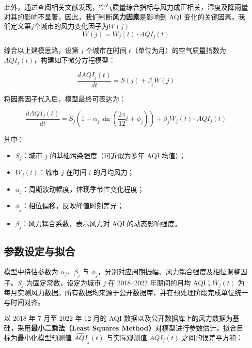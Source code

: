 \documentclass[a4paper,12pt]{article}
\begin{document}
	
	此外，通过查阅相关文献\cite{ref3}发现，空气质量综合指标与风力成正相关，湿度及降雨量对其的影响不显著。因此，我们判断\textbf{风力因素}是影响到 AQI 变化的关键因素。我们定义第$j$个城市的风力变化因子为$W(j)$
	\begin{equation}
		W(j) =  W_j(t) \cdot AQI_j(t)
		\label{eq:wj}
	\end{equation}
	
	综合以上建模思路，设第 $j$ 个城市在时间 $t$（单位为月）的空气质量指数为 $AQI_j(t)$，构建如下微分方程模型：
	
	\begin{equation}
		\frac{dAQI_j(t)}{dt} = S(j) + \beta_j W(j)
		\label{eq:sum}
	\end{equation}
	
	将因素因子代入后，模型最终可表达为：
	
	\begin{equation}
		\frac{dAQI_j(t)}{dt} = S_j \left(1 + \alpha_j \sin\left(\frac{2\pi}{12}t + \phi_j \right) \right) + \beta_j W_j(t) \cdot AQI_j(t)
		\label{eq:diff_model}
	\end{equation}
	
	其中：
	
	\begin{itemize}
		\item $S_j$：城市 $j$ 的基础污染强度（可近似为多年 AQI 均值）；
		\item $W_j(t)$：城市 $j$ 在时间 $t$ 的月均风力；
		\item $\alpha_j$：周期波动幅度，体现季节性变化程度；
		\item $\phi_j$：相位偏移，反映峰值时刻差异；
		\item $\beta_j$：风力耦合系数，表示风力对 AQI 的动态影响强度。
	\end{itemize}
	
	\subsection{参数设定与拟合}
	
	模型中待估参数为 $\alpha_j$、$\beta_j$ 与 $\phi_j$，分别对应周期振幅、风力耦合强度及相位调整因子。$S_j$ 为固定常数，设定为城市 $j$ 在 2018–2022 年期间的月均 AQI；$W_j(t)$ 为每月实测风力数据。所有数据均来源于公开数据库，并在预处理阶段完成单位统一与时间对齐。
	
	以 2018 年 7 月至 2022 年 12 月的 AQI 数据以及公开数据库上的风力数据为基础，采用\textbf{最小二乘法（Least Squares Method）}对模型进行参数估计。拟合目标为最小化模型预测值 $\widehat{AQI}_j(t)$ 与实际观测值 $AQI_j(t)$ 之间的误差平方和：
	
\end{document}
